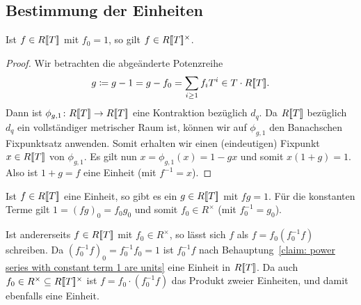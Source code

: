 \documentclass[a4paper, 10pt, numbers=noenddot]{scrartcl}
\begin{document}
\subsection*{Bestimmung der Einheiten}

\begin{claim}
  \label{claim: power series with constant term 1 are units}
  Ist $f \in R[\![T]\!]$ mit $f_0 = 1$, so gilt $f \in R[\![T]\!]^\times$.
\end{claim}
\begin{proof}
  Wir betrachten die abgeänderte Potenzreihe
  \[
              g        
    \coloneqq g - 1
    =         g - f_0
    =         \sum_{i \geq 1} f_i T^i
    \in       T \cdot R[\![T]\!].
  \]
  Dann ist $\phi_{g, 1} \colon R[\![T]\!] \to R[\![T]\!]$ eine Kontraktion bezüglich $d_q$.
  Da $R[\![T]\!]$ bezüglich $d_q$ ein vollständiger metrischer Raum ist, können wir auf $\phi_{g,1}$ den Banachschen Fixpunktsatz anwenden.
  Somit erhalten wir einen (eindeutigen) Fixpunkt $x \in R[\![T]\!]$ von $\phi_{g,1}$.
  Es gilt nun $x = \phi_{g,1}(x) = 1 - g x$ und somit $x (1 + g) = 1$.
  Also ist $1 + g = f$ eine Einheit (mit $f^{-1} = x$).
\end{proof}

Ist $f \in R[\![T]\!]$ eine Einheit, so gibt es ein $g \in R[\![T]\!]$ mit $fg = 1$.
Für die konstanten Terme gilt $1 = (fg)_0 = f_0 g_0$ und somit $f_0 \in R^\times$ (mit $f_0^{-1} = g_0$).

Ist andererseits $f \in R[\![T]\!]$ mit $f_0 \in R^\times$, so lässt sich $f$ als $f = f_0 (f_0^{-1} f)$ schreiben.
Da $(f_0^{-1} f)_0 = f_0^{-1} f_0 = 1$ ist $f_0^{-1} f$ nach Behauptung~\ref{claim: power series with constant term 1 are units} eine Einheit in $R[\![T]\!]$.
Da auch $f_0 \in R^\times \subseteq R[\![T]\!]^\times$ ist $f = f_0 \cdot (f_0^{-1} f)$ das Produkt zweier Einheiten, und damit ebenfalls eine Einheit.





\section{}
\end{document}
